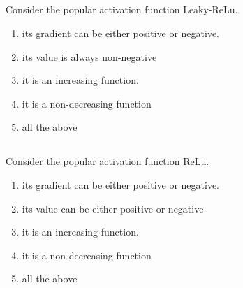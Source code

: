 \begin{frame}
\section{}
Consider the popular activation function Leaky-ReLu.

\begin{enumerate}[label=(\Alph*)]
\item its gradient can be either positive or negative.
\item its value is always non-negative
\item it is an increasing function.   %
\item it is a non-decreasing function   %
\item all the above   %
\end{enumerate}

\end{frame}

\begin{frame}
\section{}
Consider the popular activation function ReLu.

\begin{enumerate}[label=(\Alph*)]
\item its gradient can be either positive or negative.
\item its value can be either positive or negative
\item it is an increasing function.   %
\item it is a non-decreasing function     %
\item all the above   %
\end{enumerate}
\end{frame}
